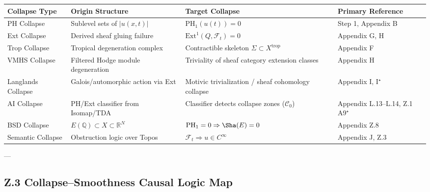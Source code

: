 \documentclass[11pt]{article}
\begin{document}
\begin{axiom}
\begin{axiom}
{{\begin{tabular}{>{\raggedright\arraybackslash}p{3.2cm} >{\raggedright\arraybackslash}p{4.0cm} >{\raggedright\arraybackslash}p{4.0cm} >{\raggedright\arraybackslash}p{2.5cm}}
\toprule
\textbf{Collapse Type} & \textbf{Origin Structure} & \textbf{Target Collapse} & \textbf{Primary Reference} \\
\midrule
PH Collapse & Sublevel sets of \( |u(x,t)| \) & \( \mathrm{PH}_1(u(t)) = 0 \) & Step 1, Appendix B \\
Ext Collapse & Derived sheaf gluing failure & \( \mathrm{Ext}^1(Q, \mathcal{F}_t) = 0 \) & Appendix G, H \\
Trop Collapse & Tropical degeneration complex & Contractible skeleton \( \Sigma \subset X^{\text{trop}} \) & Appendix F \\
VMHS Collapse & Filtered Hodge module degeneration & Triviality of sheaf category extension classes & Appendix H \\
Langlands Collapse & Galois/automorphic action via Ext & Motivic trivialization / sheaf cohomology collapse & Appendix I, I⁺ \\
AI Collapse & PH/Ext classifier from Isomap/TDA & Classifier detects collapse zones (\( \mathcal{C}_0 \)) & Appendix L.13–L.14, Z.1 A9⁺ \\
BSD Collapse & \( E(\mathbb{Q}) \subset X \subset \mathbb{R}^N \) & \( \mathrm{PH}_1 = 0 \Rightarrow \Sha(E) = 0 \) & Appendix Z.8 \\
Semantic Collapse & Obstruction logic over Topos & \( \mathcal{F}_t \Rightarrow u \in C^\infty \) & Appendix J, Z.3 \\
\bottomrule
\end{tabular}


---

\subsection*{Z.3 Collapse–Smoothness Causal Logic Map}

\begin{center}
\end{center}

}}
\end{axiom}
\end{axiom}
\end{document}
